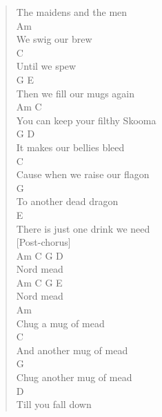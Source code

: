 \documentclass[11pt]{article}
\begin{document}
\begin{verse}
The maidens and the men\\
\hspace*{3em}Am\\
We swig our brew\\
\hspace*{2em}C\\
Until we spew\\
\hspace*{8em}G              E\\
Then we fill our mugs again\\
\vspace*{1em}
\hspace*{8em}Am               C\\
You can keep your filthy Skooma\\
\hspace*{3em}G                 D\\
It makes our bellies bleed\\
\hspace*{14em}C\\
Cause when we raise our flagon\\
\hspace*{5em}G\\
To another dead dragon\\
\hspace*{9em}E\\
There is just one drink we need\\
\vspace*{1em}
[Post-chorus]\\
\hspace*{5em}Am   C G D\\
Nord mead\\
\hspace*{5em}Am   C G E\\
Nord mead\\
\vspace*{1em}
Am\\
Chug a mug of mead\\
\hspace*{5em}C\\
And another mug of mead\\
\hspace*{6em}G\\
Chug another mug of mead\\
\hspace*{9em}D\\
Till you fall down\\
\vspace*{1em}

\end{verse}
\end{document}
